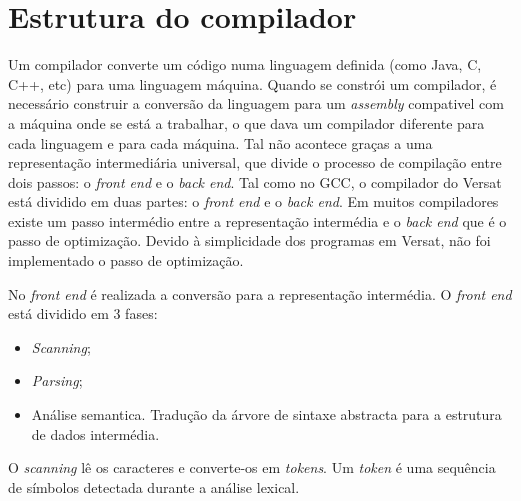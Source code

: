 
\captionsetup[table]{skip=-3pt}


\chapter{Estrutura do compilador}
\label{chapter:estrutura_do_compilador}

Um compilador converte um código numa linguagem definida (como Java, C, C++, etc) para uma linguagem máquina. Quando se constrói um compilador, é necessário
 construir a conversão da linguagem para um {\it assembly} compativel com a máquina onde se está a trabalhar, o que dava um compilador diferente para cada linguagem e para
 cada máquina. Tal não acontece graças a uma representação intermediária universal, que divide o processo de compilação entre dois passos: o 
 {\it front end} e o {\it back end}. Tal como no GCC, o compilador do Versat está dividido em duas partes: o {\it front end} e o {\it back end}.  Em muitos compiladores existe um passo intermédio entre a representação intermédia e o {\it back end} que é o passo de optimização. 
 Devido à simplicidade dos programas em Versat, não foi implementado o passo de optimização.   
 
No {\it front end} é realizada a conversão para a representação intermédia. O {\it front end} está dividido em 3 fases:
\begin{itemize}
  \item {\it Scanning};
  \item {\it Parsing};
  \item Análise semantica. Tradução da árvore de sintaxe abstracta para a estrutura de dados intermédia.
\end{itemize}

O {\it scanning} lê os caracteres e converte-os em {\it tokens}. Um {\it token} é uma sequência de símbolos detectada durante a análise lexical. 

